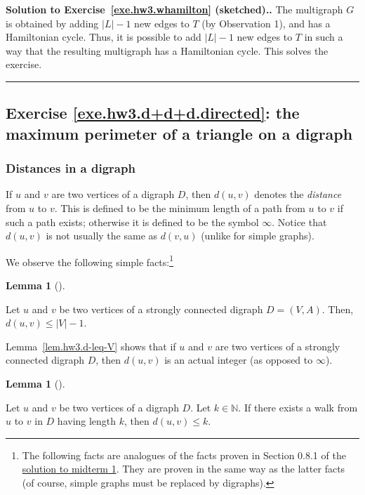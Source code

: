 \documentclass[numbers=enddot,12pt,final,onecolumn,notitlepage]{scrartcl}%
\newcounter{exer}
\theoremstyle{definition}
\newtheorem{lem}[theo]{Lemma}
\newenvironment{lemma}[1][]
{\begin{lem}[#1]\begin{leftbar}}
{\end{leftbar}\end{lem}}
\newenvironment{proof}[1][Proof]{\noindent\textbf{#1.} }{\ \rule{0.5em}{0.5em}}
\newcommand{\NN}{\mathbb{N}}
\newcommand{\abs}[1]{\left| #1 \right|}
\newcommand{\tup}[1]{\left( #1 \right)}
\begin{document}
\begin{proof}[Solution to Exercise~\ref{exe.hw3.whamilton}
(sketched).]
The multigraph $G$ is obtained by adding $\abs{L}-1$ new edges to $T$
(by Observation 1), and has a Hamiltonian cycle.
Thus, it is possible to add $\abs{L}-1$ new edges to $T$ in such a way
that the resulting multigraph has a Hamiltonian cycle.
This solves the exercise.
\end{proof}

\subsection{Exercise \ref{exe.hw3.d+d+d.directed}: the maximum
perimeter of a triangle on a digraph}

\subsubsection{Distances in a digraph}

If $u$ and $v$ are two vertices of a digraph $D$, then
$d \tup{u, v}$ denotes the \textit{distance} from $u$ to $v$. This
is defined to be the minimum length of a path from $u$ to $v$ if
such a path exists; otherwise it is defined to be the symbol $\infty$.
Notice that $d \tup{u, v}$ is not usually the same as $d \tup{v, u}$
(unlike for simple graphs).

We observe the following simple facts:\footnote{The following facts
  are analogues of the facts proven in Section 0.8.1 of the
  \href{http://www.cip.ifi.lmu.de/~grinberg/t/17s/mt1s.pdf}{solution to midterm 1}.
  They are proven in the same way as the latter facts
  (of course, simple graphs must be replaced by digraphs).}

\begin{lemma} \label{lem.hw3.d-leq-V}
Let $u$ and $v$ be two vertices of a strongly connected digraph
$D = \tup{V, A}$.
Then, $d \tup{u, v} \leq \abs{V} - 1$.
\end{lemma}

Lemma~\ref{lem.hw3.d-leq-V} shows that if $u$ and $v$ are two
vertices of a strongly connected digraph $D$, then $d \tup{u, v}$ is
an actual integer (as opposed to $\infty$).

\begin{lemma} \label{lem.hw3.walk-to-distance}
Let $u$ and $v$ be two vertices of a digraph $D$. Let
$k \in \NN$. If there exists a walk from $u$ to $v$ in $D$ having
length $k$, then $d \tup{u, v} \leq k$.
\end{lemma}
\end{document}
